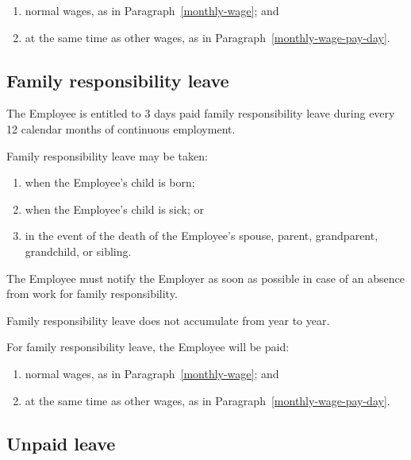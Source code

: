 \documentclass[a4paper,11pt]{article}
\begin{document}
\begin{enumerate}

  \item normal wages, as in Paragraph~\ref{monthly-wage}; and

  \item at the same time as other wages, as in
    Paragraph~\ref{monthly-wage-pay-day}.

\end{enumerate}

\subsection{Family responsibility leave}
\label{family-responsibility-leave}

\para The Employee is entitled to 3 days paid family responsibility leave during
every 12 calendar months of continuous employment.

\para Family responsibility leave may be taken:

\begin{enumerate}

  \item when the Employee's child is born;

  \item when the Employee's child is sick; or

  \item in the event of the death of the Employee's spouse, parent, grandparent,
    grandchild, or sibling.

\end{enumerate}

\para The Employee must notify the Employer as soon as possible in case of an
absence from work for family responsibility.

\para Family responsibility leave does not accumulate from year to year.

\para For family responsibility leave, the Employee will be paid:

\begin{enumerate}

  \item normal wages, as in Paragraph~\ref{monthly-wage}; and

  \item at the same time as other wages, as in
    Paragraph~\ref{monthly-wage-pay-day}.

\end{enumerate}

\subsection{Unpaid leave}
\label{unpaid-leave}
\end{document}
